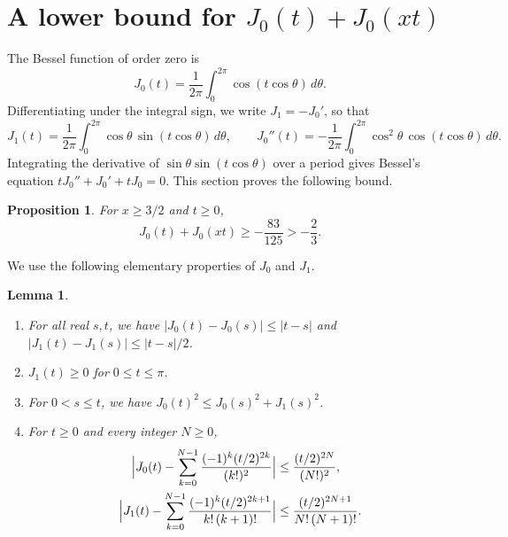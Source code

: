 \documentclass[10pt]{article}
\newtheorem{prop}[thm]{Proposition}
\newtheorem{lem}[thm]{Lemma}
\theoremstyle{remark}
\begin{document}
\section{A lower bound for \texorpdfstring{$J_0(t)+J_0(xt)$}{J0(t)+J0(xt)}}\label{sec:bessel}

The Bessel function of order zero is
\[
 J_0(t)=\frac1{2\pi}\int_0^{2\pi}\cos(t\cos\theta)\,d\theta.
\]
Differentiating under the integral sign, we write $J_1=-J_0'$, so that
\[
 J_1(t)=\frac1{2\pi}\int_0^{2\pi}\cos\theta\,\sin(t\cos\theta)\,d\theta,\qquad
 J_0''(t)=-\frac1{2\pi}\int_0^{2\pi}\cos^2\theta\,\cos(t\cos\theta)\,d\theta.
\]
Integrating the derivative of $\sin\theta\sin(t\cos\theta)$ over a period gives Bessel's equation $tJ_0''+J_0'+tJ_0=0$. This section proves the following bound.

\begin{prop}\label{prop:bessel}
For $x\ge3/2$ and $t\ge0$,
\[
 J_0(t)+J_0(xt)\ge-\frac{83}{125}>-\frac23.
\]
\end{prop}

We use the following elementary properties of $J_0$ and $J_1$.

\begin{lem}\label{lem:besselshape}
\begin{enumerate}
\item[(a)] For all real $s,t$, we have $|J_0(t)-J_0(s)|\le|t-s|$ and $|J_1(t)-J_1(s)|\le|t-s|/2$.
\item[(b)] $J_1(t)\ge0$ for $0\le t\le\pi$.
\item[(c)] For $0<s\le t$, we have $J_0(t)^2\le J_0(s)^2+J_1(s)^2$.
\item[(d)] For $t\ge0$ and every integer $N\ge0$,
\[
\begin{aligned}
 \Bigl|J_0(t)-\sum_{k=0}^{N-1}\frac{(-1)^k(t/2)^{2k}}{(k!)^2}\Bigr|&\le\frac{(t/2)^{2N}}{(N!)^2},\\
 \Bigl|J_1(t)-\sum_{k=0}^{N-1}\frac{(-1)^k(t/2)^{2k+1}}{k!\,(k+1)!}\Bigr|&\le\frac{(t/2)^{2N+1}}{N!\,(N+1)!}.
\end{aligned}
\]
\end{enumerate}
\end{lem}
\end{document}
